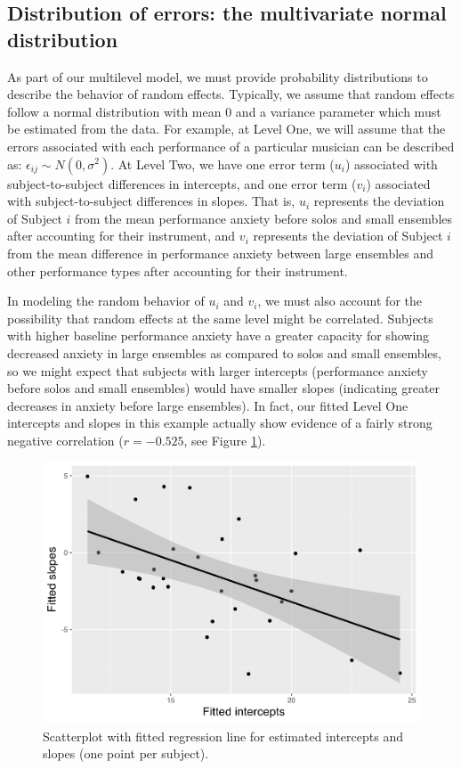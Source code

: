 \documentclass[
]{krantz}
\begin{document}
\hypertarget{MVN}{%
\subsection{Distribution of errors: the multivariate normal distribution}\label{MVN}}

As part of our multilevel model, we must provide probability distributions to describe the behavior of random effects. Typically, we assume that random effects follow a normal distribution with mean 0 and a variance parameter which must be estimated from the data. For example, at Level One, we will assume that the errors associated with each performance of a particular musician can be described as: \(\epsilon_{ij}\sim N(0,\sigma^2)\). At Level Two, we have one error term (\(u_{i}\)) associated with subject-to-subject differences in intercepts, and one error term (\(v_{i}\)) associated with subject-to-subject differences in slopes. That is, \(u_{i}\) represents the deviation of Subject \(i\) from the mean performance anxiety before solos and small ensembles after accounting for their instrument, and \(v_{i}\) represents the deviation of Subject \(i\) from the mean difference in performance anxiety between large ensembles and other performance types after accounting for their instrument.

In modeling the random behavior of \(u_{i}\) and \(v_{i}\), we must also account for the possibility that random effects at the same level might be correlated. Subjects with higher baseline performance anxiety have a greater capacity for showing decreased anxiety in large ensembles as compared to solos and small ensembles, so we might expect that subjects with larger intercepts (performance anxiety before solos and small ensembles) would have smaller slopes (indicating greater decreases in anxiety before large ensembles). In fact, our fitted Level One intercepts and slopes in this example actually show evidence of a fairly strong negative correlation (\(r=-0.525\), see Figure \ref{fig:mli-scat1}).

\begin{figure}

{\centering \includegraphics[width=0.6\linewidth]{bookdown-BeyondMLR_files/figure-latex/mli-scat1-1} 

}

\caption{Scatterplot with fitted regression line for estimated intercepts and slopes (one point per subject).}\label{fig:mli-scat1}
\end{figure}
\end{document}
